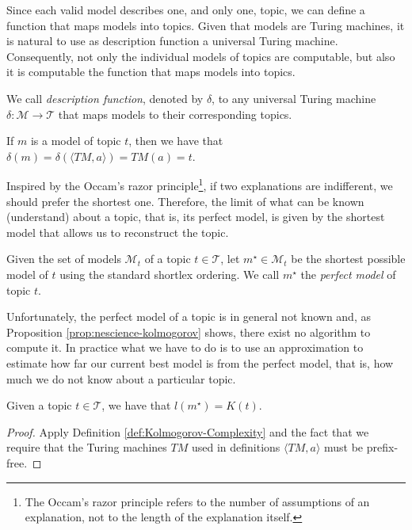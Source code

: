 Since each valid model describes one, and only one, topic, we can define a function that maps models into topics. Given that models are Turing machines, it is natural to use as description function a universal Turing machine. Consequently, not only the individual models of topics are computable, but also it is computable the function that maps models into topics.

\begin{definition}
We call \emph{description function}, denoted by $\delta$, to any universal Turing machine $\delta : \mathcal{M} \rightarrow \mathcal{T}$ that maps models to their corresponding topics.
\end{definition}

If $m$ is a model of topic $t$, then we have that $\delta \left( m \right) = \delta \left( \langle TM,a\rangle \right) = TM(a) = t$.

Inspired by the Occam's razor principle\footnote{The Occam's razor principle refers to the number of assumptions of an explanation, not to the length of the explanation itself.}, if two explanations are indifferent, we should prefer the shortest one. Therefore, the limit of what can be known (understand) about a topic, that is, its perfect model, is given by the shortest model that allows us to reconstruct the topic.

\begin{definition}
\label{def:descriptions_perfect_model}
Given the set of models $\mathcal{M}_t$ of a topic $t \in \mathcal{T}$, let $m^{\star} \in \mathcal{M}_t$ be the shortest possible model of $t$ using the standard shortlex ordering. We call $m^{\star}$ the \emph{perfect model} of topic $t$.
\end{definition}

Unfortunately, the perfect model of a topic is in general not known and, as Proposition \ref{prop:nescience-kolmogorov} shows, there exist no algorithm to compute it. In practice what we have to do is to use an approximation to estimate how far our current best model is from the perfect model, that is, how much we do not know about a particular topic.

\begin{proposition}
\label{prop:nescience-kolmogorov}
Given a topic $t \in \mathcal{T}$, we have that $l \left(m^{\star} \right) = K\left( t \right)$.
\end{proposition}
\begin{proof}
Apply Definition \ref{def:Kolmogorov-Complexity} and the fact that we require that the Turing machines $TM$ used in definitions $\langle TM,a\rangle$ must be prefix-free.
\end{proof}

